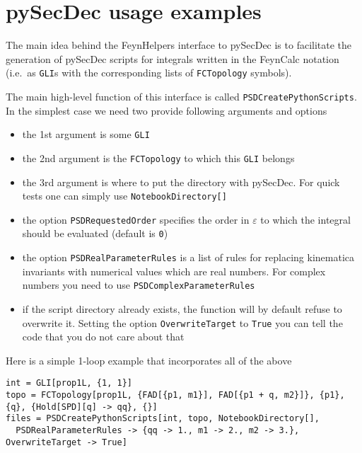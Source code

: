 \documentclass[../FeynHelpersManual.tex]{subfiles}
\begin{document}
\hypertarget{pysecdec usage examples}{
\section{pySecDec usage examples}\label{pysecdec usage examples}}

The main idea behind the FeynHelpers interface to pySecDec is to
facilitate the generation of pySecDec scripts for integrals written in
the FeynCalc notation (i.e.~as \texttt{GLI}s with the corresponding
lists of \texttt{FCTopology} symbols).

The main high-level function of this interface is called
\texttt{PSDCreatePythonScripts}. In the simplest case we need two
provide following arguments and options

\begin{itemize}
\tightlist
\item
  the 1st argument is some \texttt{GLI}
\item
  the 2nd argument is the \texttt{FCTopology} to which this \texttt{GLI}
  belongs
\item
  the 3rd argument is where to put the directory with pySecDec. For
  quick tests one can simply use
  \texttt{NotebookDirectory[\allowbreak{}]}
\item
  the option \texttt{PSDRequestedOrder} specifies the order in
  \(\varepsilon\) to which the integral should be evaluated (default is
  \texttt{0})
\item
  the option \texttt{PSDRealParameterRules} is a list of rules for
  replacing kinematica invariants with numerical values which are real
  numbers. For complex numbers you need to use
  \texttt{PSDComplexParameterRules}
\item
  if the script directory already exists, the function will by default
  refuse to overwrite it. Setting the option \texttt{OverwriteTarget} to
  \texttt{True} you can tell the code that you do not care about that
\end{itemize}

Here is a simple 1-loop example that incorporates all of the above

\begin{verbatim}
int = GLI[prop1L, {1, 1}]
topo = FCTopology[prop1L, {FAD[{p1, m1}], FAD[{p1 + q, m2}]}, {p1}, {q}, {Hold[SPD][q] -> qq}, {}]
files = PSDCreatePythonScripts[int, topo, NotebookDirectory[], 
  PSDRealParameterRules -> {qq -> 1., m1 -> 2., m2 -> 3.}, OverwriteTarget -> True]
\end{verbatim}
\end{document}

